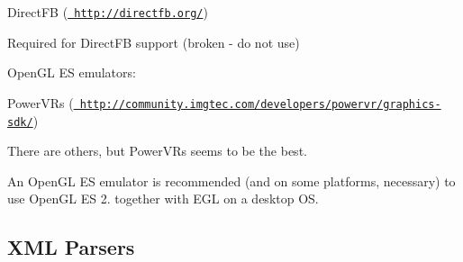 \begin{DoxyItemize}
\item Direct\+FB (\href{http://directfb.org/}{\texttt{ http\+://directfb.\+org/}})
\begin{DoxyItemize}
\item Required for Direct\+FB support (broken -\/ do not use)
\end{DoxyItemize}
\item Open\+GL ES emulators\+:
\begin{DoxyItemize}
\item Power\+VR\textquotesingle{}s (\href{http://community.imgtec.com/developers/powervr/graphics-sdk/}{\texttt{ http\+://community.\+imgtec.\+com/developers/powervr/graphics-\/sdk/}})
\item There are others, but Power\+VR\textquotesingle{}s seems to be the best.
\item An Open\+GL ES emulator is recommended (and on some platforms, necessary) to use Open\+GL ES 2. together with E\+GL on a desktop OS.
\end{DoxyItemize}
\end{DoxyItemize}\hypertarget{dependencies_dependencies_parsers}{}\subsection{X\+M\+L Parsers}\label{dependencies_dependencies_parsers}

